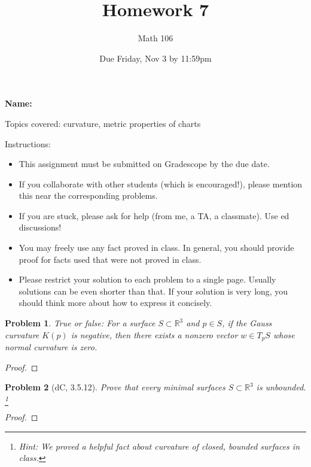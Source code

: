 \documentclass[11pt]{article}
\author{Math 106}
\date{Due Friday, Nov 3 by 11:59pm}
\title{Homework 7}
\newtheorem{problem}{Problem}
\begin{document}
\maketitle

{\bf\Large Name:} 


\vspace{.3in}
Topics covered: curvature, metric properties of charts

Instructions: 
\begin{itemize}
\item This assignment must be submitted on Gradescope by the due date. 
\item If you collaborate with other students (which is encouraged!), please mention this near the corresponding problems. 
\item If you are stuck, please ask for help (from me, a TA, a classmate). Use ed discussions!  
\item You may freely use any fact proved in class. In general, you should provide proof for facts used that were not proved in class. 
\item Please restrict your solution to each problem to a single page. Usually solutions can be even shorter than that. If your solution is very long, you should think more about how to express it concisely.
\end{itemize}
\pagebreak 


\begin{problem}
True or false: For a surface $S\subset\mathbb R^3$ and $p\in S$, if the Gauss curvature $K(p)$ is negative, then there exists a nonzero vector $w\in T_pS$ whose normal curvature is zero. 
\end{problem}

\begin{proof}

\end{proof}

\pagebreak 

\begin{problem}[dC, 3.5.12]
Prove that every minimal surfaces $S\subset\mathbb R^3$ is unbounded. \footnote{Hint: We proved a helpful fact about curvature of closed, bounded surfaces in class.}
\end{problem}

\begin{proof}

\end{proof}

\pagebreak 
\end{document}
